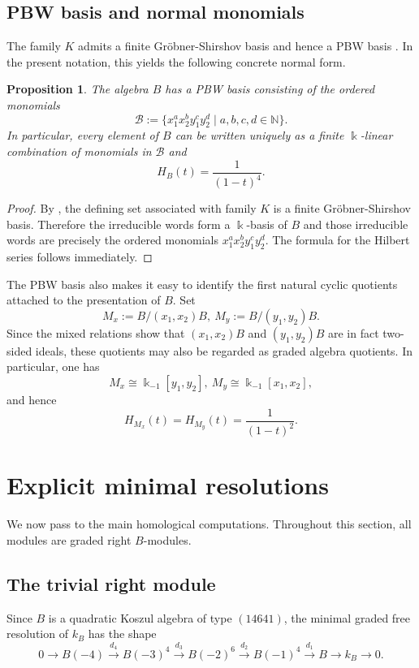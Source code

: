 \documentclass[reqno]{amsart}
\numberwithin{equation}{section}
\newtheorem{proposition}[theorem]{Proposition}
\theoremstyle{definition}
\begin{document}
\subsection{PBW basis and normal monomials}

The family \(K\) admits a finite Gr\"obner-Shirshov basis and hence a PBW basis \cite[Section~4.6]{HHR25}. In the present notation, this yields the following concrete normal form.

\begin{proposition}\label{prop:pbw}
The algebra \(B\) has a PBW basis consisting of the ordered monomials
\[
\mathcal{B}:=\{x_1^a x_2^b y_1^c y_2^d \mid a,b,c,d\in\mathbb{N}\}.
\]
In particular, every element of \(B\) can be written uniquely as a finite \(\Bbbk\)-linear combination of monomials in \(\mathcal{B}\) and
\[
H_B(t)=\frac{1}{(1-t)^4}.
\]
\end{proposition}

\begin{proof}
By \cite[Section~4.6]{HHR25}, the defining set associated with family \(K\) is a finite Gr\"obner-Shirshov basis. Therefore the irreducible words form a \(\Bbbk\)-basis of \(B\) and those irreducible words are precisely the ordered monomials \(x_1^a x_2^b y_1^c y_2^d\). The formula for the Hilbert series follows immediately.
\end{proof}

The PBW basis also makes it easy to identify the first natural cyclic quotients attached to the presentation of \(B\). Set
\[
M_x:=B/(x_1,x_2)B,
\
M_y:=B/(y_1,y_2)B.
\]
Since the mixed relations show that \((x_1,x_2)B\) and \((y_1,y_2)B\) are in fact two-sided ideals, these quotients may also be regarded as graded algebra quotients. In particular, one has
\[
M_x\cong \Bbbk_{-1}[y_1,y_2],
\
M_y\cong \Bbbk_{-1}[x_1,x_2],
\]
and hence
\[
H_{M_x}(t)=H_{M_y}(t)=\frac{1}{(1-t)^2}.
\]

\section{Explicit minimal resolutions}

We now pass to the main homological computations. Throughout this section, all modules are graded right \(B\)-modules.

\subsection{The trivial right module}

Since \(B\) is a quadratic Koszul algebra of type \((14641)\), the minimal graded free resolution of \(k_B\) has the shape
\[
0\longrightarrow B(-4)\xrightarrow{d_4}B(-3)^4\xrightarrow{d_3}B(-2)^6\xrightarrow{d_2}B(-1)^4\xrightarrow{d_1}B\longrightarrow k_B\longrightarrow 0.
\]
\end{document}
